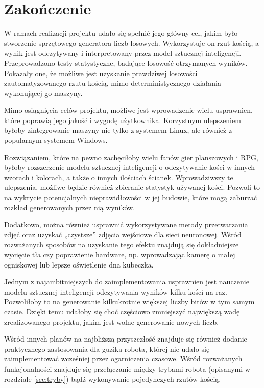
\chapter{Zakończenie}\label{ch:zakonczenie}

W ramach realizacji projektu udało się spełnić jego główny cel, jakim było stworzenie sprzętowego generatora liczb losowych.
Wykorzystuje on rzut kością, a wynik jest odczytywany i interpretowany przez model sztucznej inteligencji. Przeprowadzono
testy statystyczne, badające losowość otrzymanych wyników. Pokazały one, że możliwe jest uzyskanie prawdziwej losowości 
zautomatyzowanego rzutu kością, mimo deterministycznego działania wykonującej go maszyny.

Mimo osiągnięcia celów projektu, możliwe jest wprowadzenie wielu usprawnien, które poprawią jego jakość i wygodę użytkownika.
Korzystnym ulepszeniem byłoby zintegrowanie maszyny nie tylko z systemem Linux, ale również z popularnym systemem
Windows. 

Rozwiązaniem, które na pewno zachęciłoby wielu fanów gier planszowych i RPG, byłoby rozszerzenie modelu 
sztucznej inteligencji o odczytywanie kości w innych wzorach i kolorach, a także o innych ilościach ścianek.
Wprowadziwszy te ulepszenia, możliwe będzie również zbieranie statystyk używanej kości. Pozwoli to na wykrycie 
potencjalnych nieprawidłowości w jej budowie, które mogą zaburzać rozkład generowanych przez nią wyników.

Dodatkowo, można również usprawnić wykorzystywane metody przetwarzania zdjęć oraz uzyskać 
„czystsze” zdjęcia wejściowe dla sieci neuronowej. Wśród rozważanych sposobów na uzyskanie tego efektu znajdują się
dokładniejsze wycięcie tła czy poprawienie hardware, np. wprowadzając kamerę o małej ogniskowej lub 
lepsze oświetlenie dna kubeczka.

Jednym z najambitniejszych do zaimplementowania usprawnien jest nauczenie modelu sztucznej inteligencji odczytywania 
wyników kilku kości na raz. Pozwoliłoby to na generowanie kilkukrotnie większej liczby bitów w tym samym czasie. Dzięki
temu udałoby się choć częściowo zmniejszyć największą wadę zrealizowanego projektu, jakim jest wolne generowanie nowych
liczb.

Wśród innych planów na najbliższą przyszczłość znajduje się również dodanie praktycznego zastosowania dla guzika robota,
której nie udało się zaimplementować wcześniej przez ogarniczenia czasowe. Wśród rozważanych funkcjonalności znajduje się
przełączanie między trybami robota (opisanymi w rozdziale \ref{sec:tryby}) bądź wykonywanie pojedynczych rzutów kością.

